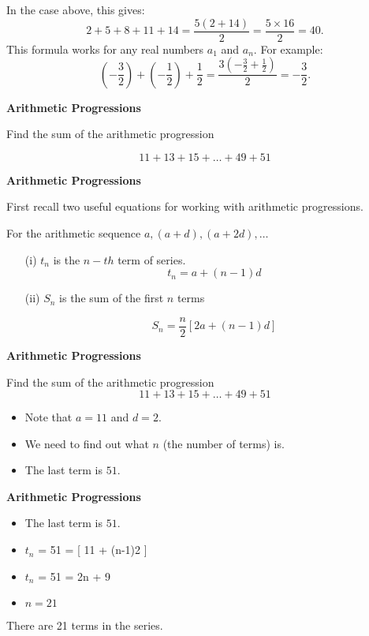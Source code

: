 \documentclass[12pt]{article}
\begin{document}
In the case above, this gives:
\[2+5+8+11+14={\frac  {5(2+14)}{2}}={\frac  {5\times 16}{2}}=40.\]
This formula works for any real numbers $a_{1}$ and $a_{n}$. For example:
\[\left(-{\frac  {3}{2}}\right)+\left(-{\frac  {1}{2}}\right)+{\frac  {1}{2}}={\frac  {3\left(-{\frac  {3}{2}}+{\frac  {1}{2}}\right)}{2}}=-{\frac  {3}{2}}.\]


\noindent\textbf{Arithmetic Progressions}

Find the sum of the arithmetic progression
{

\[ 11 + 13 + 15 + \ldots + 49 + 51 \]
}




\noindent\textbf{Arithmetic Progressions}

First recall two useful equations for working with arithmetic progressions.\\
\bigskip


For the arithmetic sequence $a,(a+d) ,(a+2d), \ldots$

\begin{itemize}
\item[(i)] $t_n$ is the $n-th$ term of series.\[ t_n= a+(n-1)d \]

\item[(ii)] $S_n$ is the sum of the first $n$ terms

\[ S_n  = \frac{n }{ 2} \left[ 2a+(n-1)d \right] \]
\end{itemize}




\noindent\textbf{Arithmetic Progressions}

Find the sum of the arithmetic progression
{
\[ 11 + 13 + 15 + \dots + 49 + 51 \]
}
\begin{itemize}
\item Note that $a=11$ and $d=2$.
\item We need to find out what $n$ (the number of terms) is.
\item The last term is $51$.
\end{itemize}




\noindent\textbf{Arithmetic Progressions}

\begin{itemize}
\item The last term is $51$.
\item $t_n$ = 51 = [ 11 + (n-1)2 ] 
\item $t_n$ = 51 = 2n + 9
\item $n=21$
\end{itemize}
There are 21 terms in the series.
\end{document}
